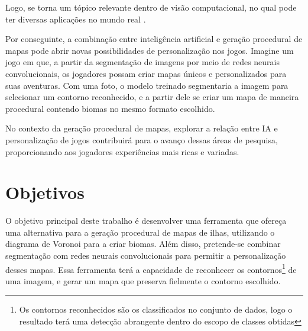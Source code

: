 
Logo, se torna um tópico relevante dentro de visão computacional, no qual pode ter diversas aplicações no mundo real \cite{kirillov2019panoptic, dp_semantic_segmantation}.

Por conseguinte, a combinação entre inteligência artificial e geração procedural de mapas pode abrir novas possibilidades de personalização nos jogos. Imagine um jogo em que, a partir da segmentação de imagens por meio de redes neurais convolucionais, os jogadores possam criar mapas únicos e personalizados para suas aventuras. Com uma foto, o modelo treinado segmentaria a imagem para selecionar um contorno reconhecido, e a partir dele se criar um mapa de maneira procedural contendo biomas no mesmo formato escolhido. 

No contexto da geração procedural de mapas, explorar a relação entre IA e personalização de jogos contribuirá para o avanço dessas áreas de pesquisa, proporcionando aos jogadores experiências mais ricas e variadas.



\section{Objetivos}

O objetivo principal deste trabalho é desenvolver uma ferramenta que ofereça uma alternativa para a geração procedural de mapas de ilhas, utilizando o diagrama de Voronoi para a criar biomas. Além disso, pretende-se combinar segmentação com redes neurais convolucionais para permitir a personalização desses mapas. Essa ferramenta terá a capacidade de reconhecer os contornos\footnote{Os contornos reconhecidos são os classificados no conjunto de dados, logo o resultado terá uma detecção abrangente dentro do escopo de classes obtidas} de uma imagem, e gerar um mapa que preserva fielmente o contorno escolhido.

